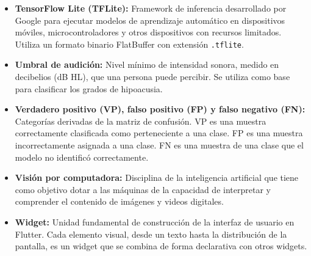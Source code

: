 \begin{itemize}
    \item[] \textbf{TensorFlow Lite (TFLite):} Framework de inferencia desarrollado por Google para ejecutar modelos de aprendizaje automático en dispositivos móviles, microcontroladores y otros dispositivos con recursos limitados. Utiliza un formato binario FlatBuffer con extensión \texttt{.tflite}.\\

    \item[] \textbf{Umbral de audición:} Nivel mínimo de intensidad sonora, medido en decibelios (dB HL), que una persona puede percibir. Se utiliza como base para clasificar los grados de hipoacusia.\\

    \item[] \textbf{Verdadero positivo (VP), falso positivo (FP) y falso negativo (FN):} Categorías derivadas de la matriz de confusión. VP es una muestra correctamente clasificada como perteneciente a una clase. FP es una muestra incorrectamente asignada a una clase. FN es una muestra de una clase que el modelo no identificó correctamente.\\

    \item[] \textbf{Visión por computadora:} Disciplina de la inteligencia artificial que tiene como objetivo dotar a las máquinas de la capacidad de interpretar y comprender el contenido de imágenes y videos digitales.\\

    \item[] \textbf{Widget:} Unidad fundamental de construcción de la interfaz de usuario en Flutter. Cada elemento visual, desde un texto hasta la distribución de la pantalla, es un widget que se combina de forma declarativa con otros widgets.
\end{itemize}
